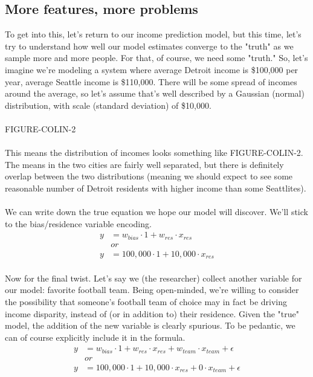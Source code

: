 \subsection{More features, more problems}

To get into this, let's return to our income prediction model, but this time,
let's try to understand how well our model estimates converge to the "truth" as
we sample more and more people. For that, of course, we need some "truth."  So,
let's imagine we're modeling a system where average Detroit income is \$100,000
per year, average Seattle income is \$110,000.  There will be some spread of
incomes around the average, so let's assume that's well described by a Gaussian
(normal) distribution, with scale (standard deviation) of \$10,000.\\
\\
FIGURE-COLIN-2\\
\\
This means the distribution of incomes looks something like FIGURE-COLIN-2.
The means in the two cities are fairly well separated, but there is definitely
overlap between the two distributions (meaning we should expect to see some
reasonable number of Detroit residents with higher income than some
Seattlites).\\
\\
We can write down the true equation we hope our model will discover.  We'll
stick to the bias/residence variable encoding.\\
\begin{align}
y &= w_\mathit{bias} \cdot 1 
    + w_\mathit{res} \cdot x_\mathit{res} \\
&\mathit{or} \\
y &= 100,000 \cdot 1 + 10,000 \cdot x_\mathit{res}
\end{align}
\\
Now for the final twist.  Let's say we (the researcher) collect another variable
for our model: favorite football team. Being open-minded, we're willing to
consider the possibility that someone's football team of choice may in fact be
driving income disparity, instead of (or in addition to) their residence.  Given
the "true" model, the addition of the new variable is clearly spurious.  To be
pedantic, we can of course explicitly include it in the formula.\\
\begin{align}
y &= w_\mathit{bias} \cdot 1 
    + w_\mathit{res} \cdot x_\mathit{res} 
    + w_\mathit{team} \cdot x_\mathit{team} 
    + \epsilon \\
&\mathit{or} \\
y &= 100,000 \cdot 1 + 10,000 \cdot x_\mathit{res} + 0 \cdot x_\mathit{team} +
\epsilon
\end{align}

